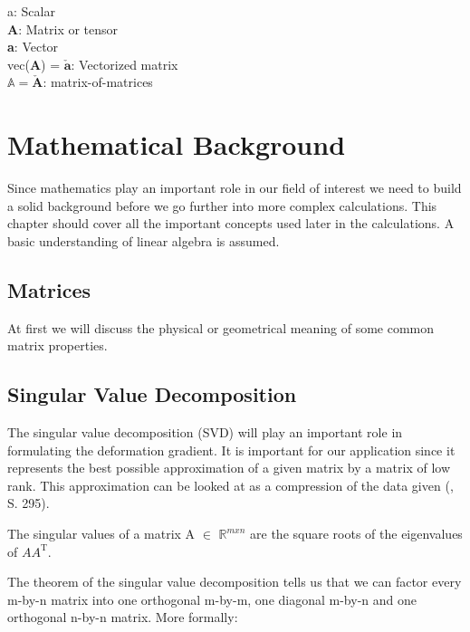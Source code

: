 \begin{addmargin}[1cm]{1cm}
a: Scalar \\
\textbf{A}: Matrix or tensor \\
\textbf{a}: Vector \\
vec(\textbf{A}) = $\boldsymbol{\check{a}}$: Vectorized matrix \\
$\mathbb{A} = \boldsymbol{\check{A}}$: matrix-of-matrices
\end{addmargin}




\section{Mathematical Background}
Since mathematics play an important role in our field of interest we need to build a solid background before we go further into more complex calculations. This chapter should cover all the important concepts used later in the calculations. A basic understanding of linear algebra is assumed.


\subsection{Matrices}
At first we will discuss the physical or geometrical meaning of some common matrix properties.


\subsection{Singular Value Decomposition}

The singular value decomposition (SVD) will play an important role in formulating the deformation gradient. It is important for our application since it represents the best possible approximation of a given matrix by a matrix of low rank. This approximation can be looked at as a compression of the data given (\cite{LiesenMehrmann2015}, S. 295).

\begin{definition}
The singular values of a matrix A $\in$ $\mathbb{R}^{m x n}$ are the square roots of the eigenvalues of $AA^{\mathrm{T}}$.
\end{definition}

The theorem of the singular value decomposition tells us that we can factor every m-by-n matrix into one orthogonal m-by-m, one diagonal m-by-n and one orthogonal n-by-n matrix. More formally:

